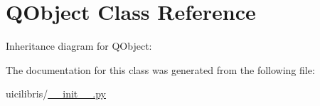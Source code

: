 \hypertarget{classQObject}{\section{\-Q\-Object \-Class \-Reference}
\label{classQObject}
}


\-Inheritance diagram for \-Q\-Object\-:


\-The documentation for this class was generated from the following file\-:\begin{DoxyCompactItemize}
\item 
uicilibris/\hyperlink{____init_____8py}{\-\_\-\-\_\-init\-\_\-\-\_\-.\-py}\end{DoxyCompactItemize}
